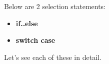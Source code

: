 \setlength{\columnsep}{3pt}
\begin{flushleft}
	
	Below are 2 selection statements:
	\begin{itemize}
		\item \textbf{if..else}
		\item \textbf{switch case}
	\end{itemize}
	Let's see each of these in detail.
	
	
\end{flushleft}





